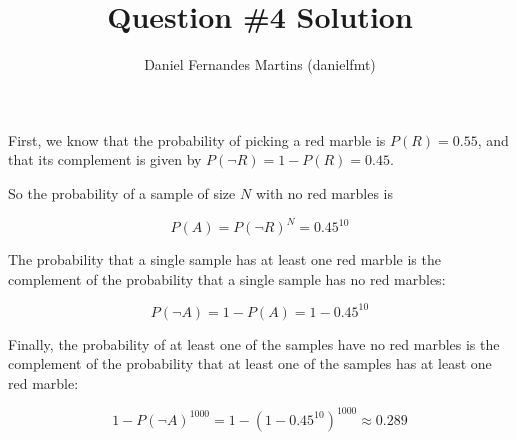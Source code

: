 \documentclass{article}
\author{Daniel Fernandes Martins (danielfmt)}
\title{Question \#4 Solution}
\begin{document}
\maketitle

First, we know that the probability of picking a red marble is
$P(R) = 0.55$, and that its complement is given by
$P(\neg R) = 1 - P(R) = 0.45$.

So the probability of a sample of size $N$ with no red marbles is

\begin{equation*}
P(A) = P(\neg R)^N = 0.45^{10}
\end{equation*}

The probability that a single sample has at least one red marble is the
complement of the probability that a single sample has no red marbles:

\begin{equation*}
P(\neg A) = 1 - P(A) = 1 - 0.45^{10}
\end{equation*}

Finally, the probability of at least one of the samples have no red marbles is
the complement of the probability that at least one of the samples has at least
one red marble:

\begin{equation*}
1 - P(\neg A)^{1000} = 1 - (1 - 0.45^{10})^{1000} \approx 0.289
\end{equation*}
\end{document}
